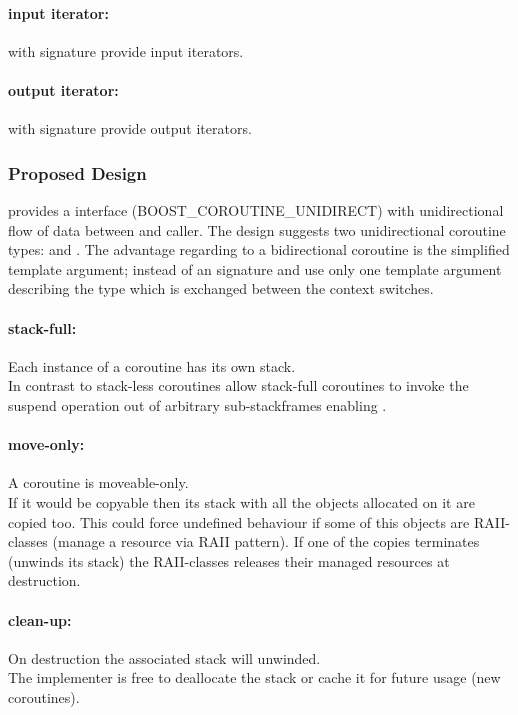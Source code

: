 \paragraph*{input iterator:}
\coro with signature  provide input iterators.

\paragraph*{output iterator:}
\coro with signature  provide output iterators.


\subsubsection*{Proposed Design}
\boostcoroutine provides a interface (BOOST_COROUTINE_UNIDIRECT) with
unidirectional flow of data between \corofunction and caller.
The design suggests two unidirectional coroutine types: \pushcoro and
\pullcoro.
The advantage regarding to a bidirectional coroutine is the simplified template
argument; instead of an signature \pullcoro and \pushcoro use only one template
argument describing the type which is exchanged between the context switches.

\paragraph*{stack-full:}
Each instance of a coroutine has its own stack.\\
\newline
In contrast to stack-less coroutines allow stack-full coroutines to invoke the
suspend operation out of arbitrary sub-stackframes enabling \escreops.

\paragraph*{move-only:}
A coroutine is moveable-only.\\
\newline
If it would be copyable then its stack with all the objects allocated on it
are copied too. This could force undefined behaviour if some of this objects are
RAII-classes (manage a resource via RAII pattern). If one of the copies
terminates (unwinds its stack) the RAII-classes releases their managed resources
at destruction.

\paragraph*{clean-up:}
On destruction the associated stack will unwinded.\\
\newline
The implementer is free to deallocate the stack or cache it for future usage
(new coroutines).

